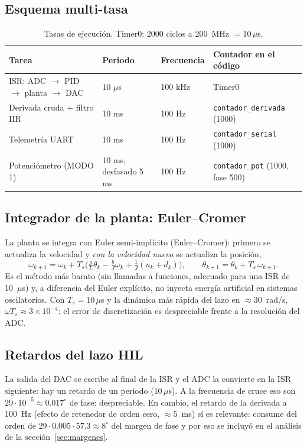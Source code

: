 \documentclass[11pt,a4paper]{article}
\begin{document}
\subsection{Esquema multi-tasa}
\begin{table}[H]\centering\small
\begin{tabular}{@{}llll@{}}\toprule
Tarea & Periodo & Frecuencia & Contador en el c\'odigo \\ \midrule
ISR: ADC $\rightarrow$ PID $\rightarrow$ planta $\rightarrow$ DAC & 10 $\mu$s & 100 kHz & Timer0 \\
Derivada cruda + filtro IIR & 10 ms & 100 Hz & \texttt{contador\_derivada} (1000) \\
Telemetr\'ia UART & 10 ms & 100 Hz & \texttt{contador\_serial} (1000) \\
Potenci\'ometro (MODO 1) & 10 ms, desfasado 5 ms & 100 Hz & \texttt{contador\_pot} (1000, fase 500) \\ \bottomrule
\end{tabular}
\caption{Tasas de ejecuci\'on. Timer0: 2000 ciclos a 200~MHz $=10\,\mu$s.}
\end{table}

\subsection{Integrador de la planta: Euler--Cromer}
La planta se integra con Euler semi-impl\'icito (Euler--Cromer): primero se actualiza la
velocidad y \emph{con la velocidad nueva} se actualiza la posici\'on,
\begin{equation}
\omega_{k+1}=\omega_k+T_s\Big(\tfrac gL\theta_k-\tfrac bJ\omega_k+\tfrac1J(u_k+d_k)\Big),\qquad
\theta_{k+1}=\theta_k+T_s\,\omega_{k+1}.
\end{equation}
Es el m\'etodo m\'as barato (sin llamadas a funciones, adecuado para una ISR de 10~$\mu$s) y,
a diferencia del Euler expl\'icito, no inyecta energ\'ia artificial en sistemas oscilatorios.
Con $T_s=10\,\mu$s y la din\'amica m\'as r\'apida del lazo en $\approx30$~rad/s, $\omega T_s\approx3\times10^{-4}$:
el error de discretizaci\'on es despreciable frente a la resoluci\'on del ADC.

\subsection{Retardos del lazo HIL}
La salida del DAC se escribe al final de la ISR y el ADC la convierte en la ISR siguiente: hay
un retardo de un periodo ($10\,\mu$s). A la frecuencia de cruce eso son
$29\cdot10^{-5}\approx0.017^\circ$ de fase: despreciable. En cambio, el retardo de la derivada a
100~Hz (efecto de retenedor de orden cero, $\approx5$~ms) s\'i es relevante: consume del orden de
$29\cdot0.005\cdot57.3\approx8^\circ$ del margen de fase y por eso se incluy\'o en el an\'alisis de la
secci\'on~\ref{sec:margenes}.
\end{document}
